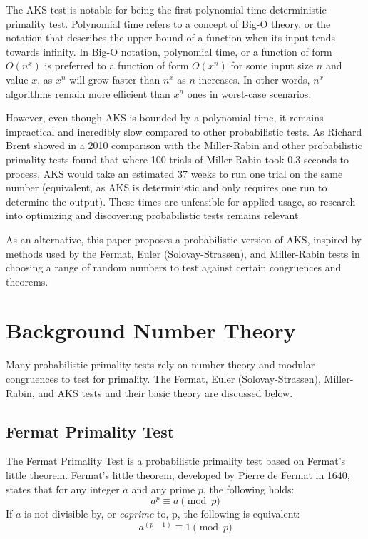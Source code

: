 \documentclass{article}
\begin{document}
The AKS test is notable for being the first polynomial time deterministic primality test. Polynomial time refers to a concept of Big-O theory, or the notation that describes the upper bound of a function when its input tends towards infinity. In Big-O notation, polynomial time, or a function of form $O(n^x)$ is preferred to a function of form $O(x^n)$ for some input size $n$ and value $x$, as $x^n$ will grow faster than $n^x$ as $n$ increases. In other words, $n^x$ algorithms remain more efficient than $x^n$ ones in worst-case scenarios. 

However, even though AKS is bounded by a polynomial time, it remains impractical and incredibly slow compared to other probabilistic tests. As Richard Brent showed in a 2010 comparison with the Miller-Rabin and other probabilistic primality tests found that where 100 trials of Miller-Rabin took 0.3 seconds to process, AKS would take an estimated 37 weeks to run one trial on the same number (equivalent, as AKS is deterministic and only requires one run to determine the output). These times are unfeasible for applied usage, so research into optimizing and discovering probabilistic tests remains relevant.

As an alternative, this paper proposes a probabilistic version of AKS, inspired by methods used by the Fermat, Euler (Solovay-Strassen), and Miller-Rabin tests in choosing a range of random numbers to test against certain congruences and theorems.

\section{Background Number Theory}

Many probabilistic primality tests rely on number theory and modular congruences to test for primality. The Fermat, Euler (Solovay-Strassen), Miller-Rabin, and AKS tests and their basic theory are discussed below.

\subsection{Fermat Primality Test}
The Fermat Primality Test is a probabilistic primality test based on Fermat's little theorem.
Fermat's little theorem, developed by Pierre de Fermat in 1640, states that for any integer $a$ and any prime $p$, the following holds:
\[
    a^p \equiv a \pmod{p} 
\]
If $a$ is not divisible by, or \emph{coprime} to, p, the following is equivalent:
\[
    a^{(p - 1)} \equiv 1 \pmod{p} 
\]
\end{document}
